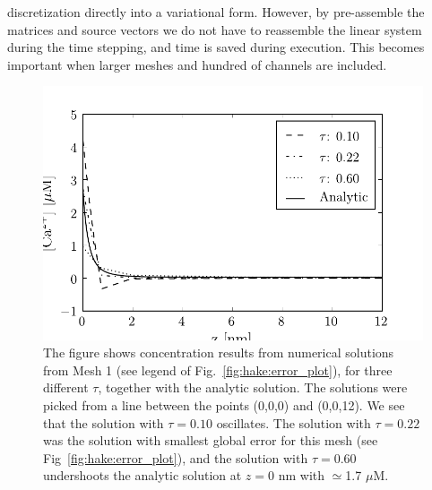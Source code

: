 discretization directly into a variational form. However, by
pre-assemble the matrices and source vectors we do not have to
reassemble the linear system during the time stepping, and time is
saved during execution. This becomes important when larger meshes and
hundred of channels are included.\par
\begin{figure}
  \label{fig:hake:traces_mesh_1}
  \includegraphics[width=\linewidth]{chapters/hake/pdf/traces_mesh_1}
  \caption[Concentration traces 1]{The figure shows concentration
    results from numerical solutions from Mesh 1 (see legend of
    Fig.~\ref{fig:hake:error_plot}), for three different $\tau$,
    together with the analytic solution. The solutions were picked
    from a line between the points (0,0,0) and (0,0,12). We see that
    the solution with $\tau=0.10$ oscillates. The solution with
    $\tau=0.22$ was the solution with smallest global error for this
    mesh (see Fig~\ref{fig:hake:error_plot}), and the solution with
    $\tau=0.60$ undershoots the analytic solution at $z=0$ nm with
    $\simeq$1.7 $\mu$M.}
\end{figure}

